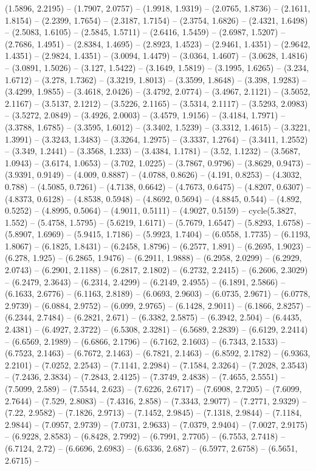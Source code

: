(1.5896, 2.2195) -- (1.7907, 2.0757) -- (1.9918, 1.9319) -- (2.0765, 1.8736) -- (2.1611, 1.8154) -- (2.2399, 1.7654) -- (2.3187, 1.7154) -- (2.3754, 1.6826) -- (2.4321, 1.6498) -- (2.5083, 1.6105) -- (2.5845, 1.5711) -- (2.6416, 1.5459) -- (2.6987, 1.5207) -- (2.7686, 1.4951) -- (2.8384, 1.4695) -- (2.8923, 1.4523) -- (2.9461, 1.4351) -- (2.9642, 1.4351) -- (2.9824, 1.4351) -- (3.0094, 1.4479) -- (3.0364, 1.4607) -- (3.0628, 1.4816) -- (3.0891, 1.5026) -- (3.127, 1.5422) -- (3.1649, 1.5819) -- (3.1995, 1.6265) -- (3.234, 1.6712) -- (3.278, 1.7362) -- (3.3219, 1.8013) -- (3.3599, 1.8648) -- (3.398, 1.9283) -- (3.4299, 1.9855) -- (3.4618, 2.0426) -- (3.4792, 2.0774) -- (3.4967, 2.1121) -- (3.5052, 2.1167) -- (3.5137, 2.1212) -- (3.5226, 2.1165) -- (3.5314, 2.1117) -- (3.5293, 2.0983) -- (3.5272, 2.0849) -- (3.4926, 2.0003) -- (3.4579, 1.9156) -- (3.4184, 1.7971) -- (3.3788, 1.6785) -- (3.3595, 1.6012) -- (3.3402, 1.5239) -- (3.3312, 1.4615) -- (3.3221, 1.3991) -- (3.3243, 1.3483) -- (3.3264, 1.2975) -- (3.3337, 1.2764) -- (3.3411, 1.2552) -- (3.349, 1.2441) -- (3.3568, 1.233) -- (3.4384, 1.1781) -- (3.52, 1.1232) -- (3.5687, 1.0943) -- (3.6174, 1.0653) -- (3.702, 1.0225) -- (3.7867, 0.9796) -- (3.8629, 0.9473) -- (3.9391, 0.9149) -- (4.009, 0.8887) -- (4.0788, 0.8626) -- (4.191, 0.8253) -- (4.3032, 0.788) -- (4.5085, 0.7261) -- (4.7138, 0.6642) -- (4.7673, 0.6475) -- (4.8207, 0.6307) -- (4.8373, 0.6128) -- (4.8538, 0.5948) -- (4.8692, 0.5694) -- (4.8845, 0.544) -- (4.892, 0.5252) -- (4.8995, 0.5064) -- (4.9011, 0.5111) -- (4.9027, 0.5159) -- cycle(5.3827, 1.552) -- (5.4758, 1.5795) -- (5.6219, 1.6171) -- (5.7679, 1.6547) -- (5.8293, 1.6758) -- (5.8907, 1.6969) -- (5.9415, 1.7186) -- (5.9923, 1.7404) -- (6.0558, 1.7735) -- (6.1193, 1.8067) -- (6.1825, 1.8431) -- (6.2458, 1.8796) -- (6.2577, 1.891) -- (6.2695, 1.9023) -- (6.278, 1.925) -- (6.2865, 1.9476) -- (6.2911, 1.9888) -- (6.2958, 2.0299) -- (6.2929, 2.0743) -- (6.2901, 2.1188) -- (6.2817, 2.1802) -- (6.2732, 2.2415) -- (6.2606, 2.3029) -- (6.2479, 2.3643) -- (6.2314, 2.4299) -- (6.2149, 2.4955) -- (6.1891, 2.5866) -- (6.1633, 2.6776) -- (6.1163, 2.8189) -- (6.0693, 2.9603) -- (6.0735, 2.9671) -- (6.0778, 2.9739) -- (6.0884, 2.9752) -- (6.099, 2.9765) -- (6.1428, 2.9011) -- (6.1866, 2.8257) -- (6.2344, 2.7484) -- (6.2821, 2.671) -- (6.3382, 2.5875) -- (6.3942, 2.504) -- (6.4435, 2.4381) -- (6.4927, 2.3722) -- (6.5308, 2.3281) -- (6.5689, 2.2839) -- (6.6129, 2.2414) -- (6.6569, 2.1989) -- (6.6866, 2.1796) -- (6.7162, 2.1603) -- (6.7343, 2.1533) -- (6.7523, 2.1463) -- (6.7672, 2.1463) -- (6.7821, 2.1463) -- (6.8592, 2.1782) -- (6.9363, 2.2101) -- (7.0252, 2.2543) -- (7.1141, 2.2984) -- (7.1584, 2.3264) -- (7.2028, 2.3543) -- (7.2436, 2.3834) -- (7.2843, 2.4125) -- (7.3749, 2.4838) -- (7.4655, 2.5551) -- (7.5099, 2.589) -- (7.5544, 2.623) -- (7.6226, 2.6717) -- (7.6908, 2.7205) -- (7.6099, 2.7644) -- (7.529, 2.8083) -- (7.4316, 2.858) -- (7.3343, 2.9077) -- (7.2771, 2.9329) -- (7.22, 2.9582) -- (7.1826, 2.9713) -- (7.1452, 2.9845) -- (7.1318, 2.9844) -- (7.1184, 2.9844) -- (7.0957, 2.9739) -- (7.0731, 2.9633) -- (7.0379, 2.9404) -- (7.0027, 2.9175) -- (6.9228, 2.8583) -- (6.8428, 2.7992) -- (6.7991, 2.7705) -- (6.7553, 2.7418) -- (6.7124, 2.72) -- (6.6696, 2.6983) -- (6.6336, 2.687) -- (6.5977, 2.6758) -- (6.5651, 2.6715) -- 